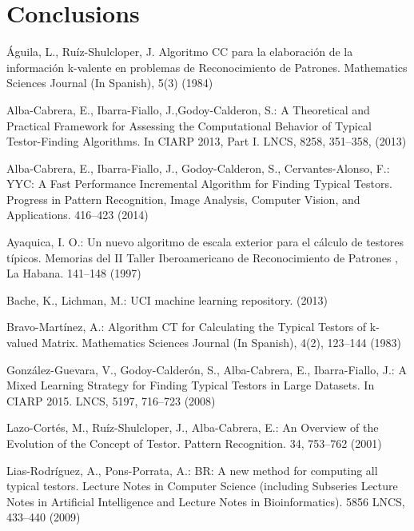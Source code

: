 \documentclass[citeauthoryear]{llncs}
\begin{document}
\section{Conclusions}
%
%
\begin{thebibliography}{}
%


	Águila, L., Ruíz-Shulcloper, J.  
	Algoritmo CC para la elaboración de la información k-valente en problemas de Reconocimiento de Patrones. 
	Mathematics Sciences Journal (In Spanish), 
	5(3) (1984)
	
	Alba-Cabrera, E., Ibarra-Fiallo, J.,Godoy-Calderon, S.:
	A Theoretical and Practical Framework for Assessing the Computational Behavior of Typical Testor-Finding Algorithms.
	In CIARP 2013, Part I. LNCS,
	8258, 351--358, (2013)
	
	Alba-Cabrera, E., Ibarra-Fiallo, J., Godoy-Calderon, S., Cervantes-Alonso, F.:
	YYC: A Fast Performance Incremental Algorithm for Finding Typical Testors.
	Progress in Pattern Recognition, Image Analysis, Computer Vision, and Applications.
	416--423 (2014)
	
	Ayaquica, I. O.:
	Un nuevo algoritmo de escala exterior para el c\'alculo de testores t\'ipicos.
	Memorias del II Taller Iberoamericano de Reconocimiento de Patrones , La
	Habana. 141--148 (1997)
	
	Bache, K., Lichman, M.:
	UCI machine learning repository.
	(2013)
	
	Bravo-Martínez, A.:
	Algorithm CT for Calculating the Typical Testors of k-valued Matrix. 
	Mathematics Sciences Journal (In Spanish), 
	4(2), 123--144 (1983)
	
	González-Guevara, V., Godoy-Calderón, S., Alba-Cabrera, E.,  Ibarra-Fiallo, J.:
	A Mixed Learning Strategy for Finding Typical Testors in Large Datasets. 
	In CIARP 2015. LNCS,
	5197, 716--723 (2008)
		
	Lazo-Cort\'es, M., Ruíz-Shulcloper, J., Alba-Cabrera, E.:
	An Overview of the Evolution of the Concept of Testor. 
	Pattern Recognition. 34, 753--762 (2001)

	Lias-Rodr\'iguez, A., Pons-Porrata, A.:
	BR: A new method for computing all typical testors. 
	Lecture Notes in Computer Science (including Subseries Lecture Notes 
	in Artificial Intelligence and Lecture Notes in Bioinformatics).
	5856 LNCS, 433--440 (2009)


\end{thebibliography}
\end{document}

